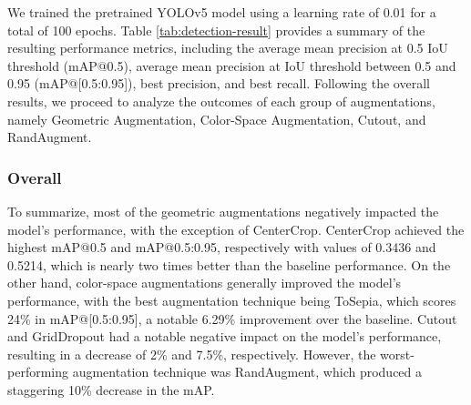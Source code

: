 We trained the pretrained YOLOv5 model using a learning rate of 0.01 for a total of 100 epochs. Table \ref{tab:detection-result} provides a summary of the resulting performance metrics, including the average mean precision at 0.5 IoU threshold (mAP@0.5), average mean precision at IoU threshold between 0.5 and 0.95 (mAP@[0.5:0.95]), best precision, and best recall. Following the overall results, we proceed to analyze the outcomes of each group of augmentations, namely Geometric Augmentation, Color-Space Augmentation, Cutout, and RandAugment.

\subsubsection{Overall}
To summarize, most of the geometric augmentations negatively impacted the model's performance, with the exception of CenterCrop. CenterCrop achieved the highest mAP@0.5 and mAP@0.5:0.95, respectively with values of 0.3436 and 0.5214, which is nearly two times better than the baseline performance. On the other hand, color-space augmentations generally improved the model's performance, with the best augmentation technique being ToSepia, which scores 24\%  in mAP@[0.5:0.95], a notable 6.29\% improvement over the baseline. Cutout and GridDropout had a notable negative impact on the model's performance, resulting in a decrease of 2\% and 7.5\%, respectively. However, the worst-performing augmentation technique was RandAugment, which produced a staggering 10\% decrease in the mAP.

